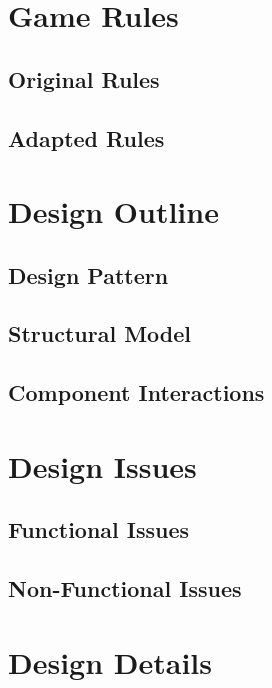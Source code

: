 \documentclass[12pt]{article}
\begin{document}
\section{Game Rules}

\subsection{Original Rules}


\subsection{Adapted Rules}



\section{Design Outline}

\subsection{Design Pattern}


\subsection{Structural Model}


\subsection{Component Interactions}



\section{Design Issues}

\subsection{Functional Issues}


\subsection{Non-Functional Issues}


\section{Design Details}
\end{document}

